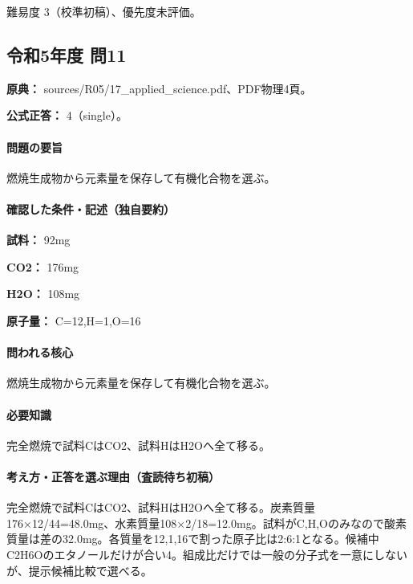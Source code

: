 \par 難易度 3（校準初稿）、優先度未評価。

\subsection{令和5年度 問11}
\label{q:r05-reg-applied-11}

\noindent\textbf{原典：} sources/R05/17\_applied\_science.pdf、PDF物理4頁。

\textbf{公式正答：} 4（single）。

\paragraph{問題の要旨} 燃焼生成物から元素量を保存して有機化合物を選ぶ。

\paragraph{確認した条件・記述（独自要約）}\mbox{}\par

\noindent\textbf{試料：} 92mg\par

\noindent\textbf{CO2：} 176mg\par

\noindent\textbf{H2O：} 108mg\par

\noindent\textbf{原子量：} C=\allowbreak{}12,H=\allowbreak{}1,O=\allowbreak{}16\par

\paragraph{問われる核心} 燃焼生成物から元素量を保存して有機化合物を選ぶ。

\paragraph{必要知識} 完全燃焼で試料CはCO2、試料HはH2Oへ全て移る。

\paragraph{考え方・正答を選ぶ理由（査読待ち初稿）} 完全燃焼で試料CはCO2、試料HはH2Oへ全て移る。炭素質量176×12/44=\allowbreak{}48.0mg、水素質量108×2/18=\allowbreak{}12.0mg。試料がC,H,Oのみなので酸素質量は差の32.0mg。各質量を12,1,16で割った原子比は2:6:1となる。候補中C2H6Oのエタノールだけが合い4。組成比だけでは一般の分子式を一意にしないが、提示候補比較で選べる。

